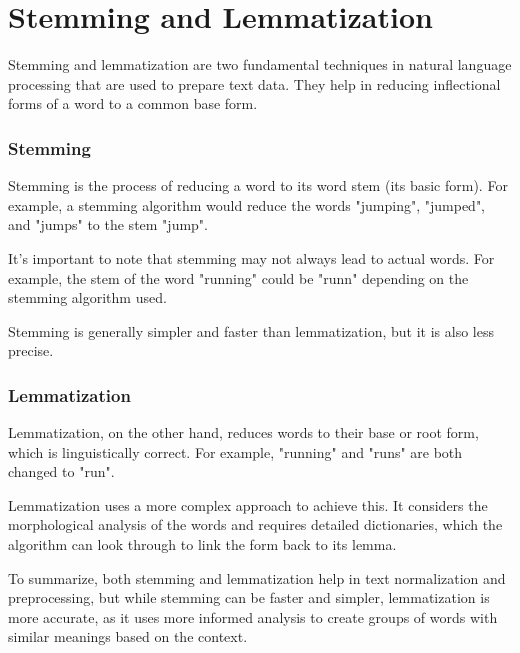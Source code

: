 \chapter{Stemming and Lemmatization}

Stemming and lemmatization are two fundamental techniques in natural language processing that are used to prepare text data. They help in reducing inflectional forms of a word to a common base form. 

\subsection{Stemming}

Stemming is the process of reducing a word to its word stem (its basic form). For example, a stemming algorithm would reduce the words "jumping", "jumped", and "jumps" to the stem "jump".

It's important to note that stemming may not always lead to actual words. For example, the stem of the word "running" could be "runn" depending on the stemming algorithm used.

Stemming is generally simpler and faster than lemmatization, but it is also less precise.

\subsection{Lemmatization}

Lemmatization, on the other hand, reduces words to their base or root form, which is linguistically correct. For example, "running" and "runs" are both changed to "run".

Lemmatization uses a more complex approach to achieve this. It considers the morphological analysis of the words and requires detailed dictionaries, which the algorithm can look through to link the form back to its lemma.

To summarize, both stemming and lemmatization help in text normalization and preprocessing, but while stemming can be faster and simpler, lemmatization is more accurate, as it uses more informed analysis to create groups of words with similar meanings based on the context.
